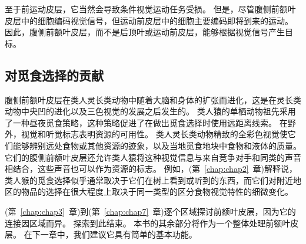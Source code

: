 至于前运动皮层，它当然会导致条件视觉运动任务受损\cite{halsband1985premotor,petrides2019conditional}。
但是，尽管腹侧前额叶皮层中的细胞编码视觉信号，但运动前皮层中的细胞主要编码即将到来的运动\cite{pllegrino1991neurophysiological}。
因此，腹侧前额叶皮层，而不是后顶叶或运动前皮层，能够根据视觉信号产生目标。



\subsection{对觅食选择的贡献}
\par

腹侧前额叶皮层在类人灵长类动物中随着大脑和身体的扩张而进化，这是在灵长类动物中央凹的进化以及三色视觉的发展之后发生的。
类人猿的单栖动物祖先采用了一种昼夜觅食策略，这种策略促进了在做出觅食选择时使用远距离线索。
在野外，视觉和听觉标志表明资源的可用性。
类人灵长类动物精致的全彩色视觉使它们能够辨别远处食物或其他资源的迹象，以及当地觅食地块中食物和液体的质量。
它们的腹侧前额叶皮层还允许类人猿将这种视觉信息与来自竞争对手和同类的声音相结合，这些声音也可以作为资源的标志。
例如，(第~\ref{chap:chap2}~章)解释说，类人猴的觅食选择似乎通常取决于它们在树上看到或听到的东西，而它们对附近地区的物品的选择在很大程度上取决于同一类型的区分食物视觉特性的细微变化。
\par


(第~\ref{chap:chap3}~章)到(第~\ref{chap:chap7}~章)逐个区域探讨前额叶皮层，因为它的连接因区域而异。
探索到此结束。
本书的其余部分将作为一个整体处理前额叶皮层。 
在下一章中，我们建议它具有简单的基本功能。

